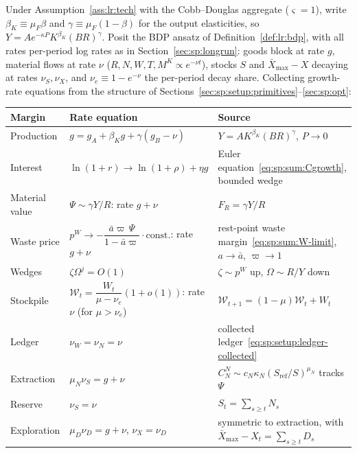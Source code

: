 Under Assumption~\ref{ass:lr:tech} with the Cobb--Douglas aggregate ($\varsigma=1$), write $\beta_K\equiv\mu_F\beta$ and $\gamma\equiv\mu_F\left(1-\beta\right)$ for the output elasticities, so $Y=Ae^{-\kappa P}K^{\beta_K}\left(BR\right)^{\gamma}$. Posit the BDP ansatz of Definition~\ref{def:lr:bdp}, with all rates per-period log rates as in Section~\ref{sec:sp:longrun}: goods block at rate $g$, material flows at rate $\nu$ ($R,N,W,T,M^K\propto e^{-\nu t}$), stocks $S$ and $\bar X_{\max}-X$ decaying at rates $\nu_S,\nu_X$, and $\nu_e\equiv1-e^{-\nu}$ the per-period decay share. Collecting growth-rate equations from the structure of Sections~\ref{sec:sp:setup:primitives}--\ref{sec:sp:opt}:
\begin{center}
\begin{tabular}{lll}
\toprule
Margin & Rate equation & Source \\
\midrule
Production & $g=g_A+\beta_Kg+\gamma\left(g_B-\nu\right)$ & $Y=AK^{\beta_K}\left(BR\right)^{\gamma}$, $P\to0$ \\
Interest & $\ln\left(1+r\right)\to\ln\left(1+\rho\right)+\eta g$ & Euler equation~\eqref{eq:sp:sum:Cgrowth}, bounded wedge \\
Material value & $\Psi\sim\gamma Y/R$: rate $g+\nu$ & $F_R=\gamma Y/R$ \\
Waste price & $p^W\to-\dfrac{\bar a\varpi\,\Psi}{1-\bar a\varpi}\cdot\text{const.}$: rate $g+\nu$ & rest-point waste margin~\eqref{eq:sp:sum:W-limit}, $a\to\bar a$, $\varpi\to1$ \\
Wedges & $\zeta\Omega^j=O\left(1\right)$ & $\zeta\sim p^W$ up, $\Omega\sim R/Y$ down \\
Stockpile & $\mathcal W_t=\dfrac{W_t}{\mu-\nu_e}\left(1+o\left(1\right)\right)$: rate $\nu$ (for $\mu>\nu_e$) & $\mathcal W_{t+1}=\left(1-\mu\right)\mathcal W_t+W_t$ \\
Ledger & $\nu_W=\nu_N=\nu$ & collected ledger~\eqref{eq:sp:setup:ledger-collected} \\
Extraction & $\mu_N\nu_S=g+\nu$ & $C^N_N\sim c_N\kappa_N\left(S_{\mathrm{ref}}/S\right)^{\mu_N}$ tracks $\Psi$ \\
Reserve & $\nu_S=\nu$ & $S_t=\sum_{s\ge t} N_s$ \\
Exploration & $\mu_D\nu_D=g+\nu$, $\nu_X=\nu_D$ & symmetric to extraction, with $\bar X_{\max}-X_t=\sum_{s\ge t}D_s$ \\
\bottomrule
\end{tabular}
\end{center}
